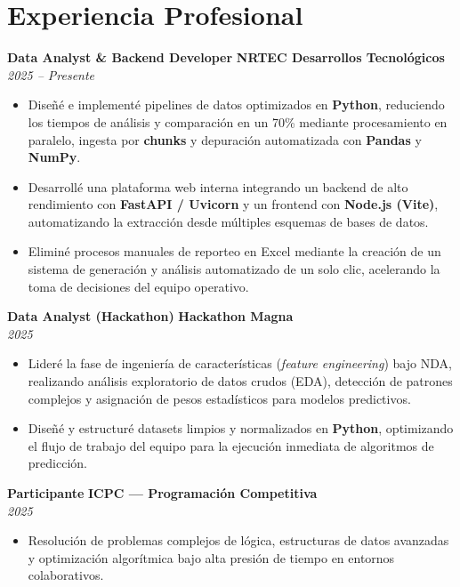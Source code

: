 \documentclass[10pt,a4paper]{article}
\begin{document}
\section{Experiencia Profesional}

\noindent\textbf{Data Analyst \& Backend Developer} \hfill \textbf{NRTEC Desarrollos Tecnológicos} \\
\textit{2025 -- Presente}
\begin{itemize}[leftmargin=*,nosep,after=\vspace{0.05em},itemsep=0pt]
  \item Diseñé e implementé pipelines de datos optimizados en \textbf{Python}, reduciendo los tiempos de análisis y comparación en un 70\% mediante procesamiento en paralelo, ingesta por \textbf{chunks} y depuración automatizada con \textbf{Pandas} y \textbf{NumPy}.
  \item Desarrollé una plataforma web interna integrando un backend de alto rendimiento con \textbf{FastAPI / Uvicorn} y un frontend con \textbf{Node.js (Vite)}, automatizando la extracción desde múltiples esquemas de bases de datos.
  \item Eliminé procesos manuales de reporteo en Excel mediante la creación de un sistema de generación y análisis automatizado de un solo clic, acelerando la toma de decisiones del equipo operativo.
\end{itemize}

\noindent\textbf{Data Analyst (Hackathon)} \hfill \textbf{Hackathon Magna} \\
\textit{2025}
\begin{itemize}[leftmargin=*,nosep,after=\vspace{0.05em},itemsep=0pt]
  \item Lideré la fase de ingeniería de características (\textit{feature engineering}) bajo NDA, realizando análisis exploratorio de datos crudos (EDA), detección de patrones complejos y asignación de pesos estadísticos para modelos predictivos.
  \item Diseñé y estructuré datasets limpios y normalizados en \textbf{Python}, optimizando el flujo de trabajo del equipo para la ejecución inmediata de algoritmos de predicción.
\end{itemize}

\noindent\textbf{Participante} \hfill \textbf{ICPC — Programación Competitiva} \\
\textit{2025}
\begin{itemize}[leftmargin=*,nosep,after=\vspace{0.05em},itemsep=0pt]
  \item Resolución de problemas complejos de lógica, estructuras de datos avanzadas y optimización algorítmica bajo alta presión de tiempo en entornos colaborativos.
\end{itemize}
\end{document}
